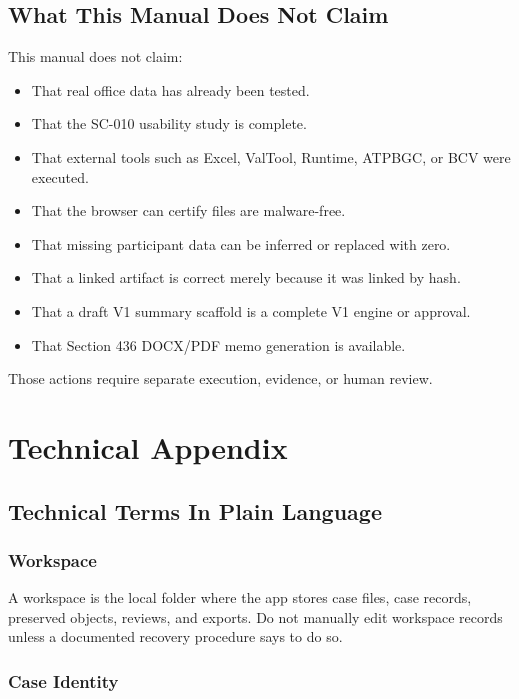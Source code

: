 \chapter{What This Manual Does Not Claim}

This manual does not claim:

\begin{itemize}
  \item That real office data has already been tested.
  \item That the SC-010 usability study is complete.
  \item That external tools such as Excel, ValTool, Runtime, ATPBGC, or BCV were executed.
  \item That the browser can certify files are malware-free.
  \item That missing participant data can be inferred or replaced with zero.
  \item That a linked artifact is correct merely because it was linked by hash.
  \item That a draft V1 summary scaffold is a complete V1 engine or approval.
  \item That Section 436 DOCX/PDF memo generation is available.
\end{itemize}

Those actions require separate execution, evidence, or human review.

\part{Technical Appendix}

\chapter{Technical Terms In Plain Language}

\section{Workspace}

A workspace is the local folder where the app stores case files, case records, preserved objects, reviews, and exports. Do not manually edit workspace records unless a documented recovery procedure says to do so.

\section{Case Identity}

